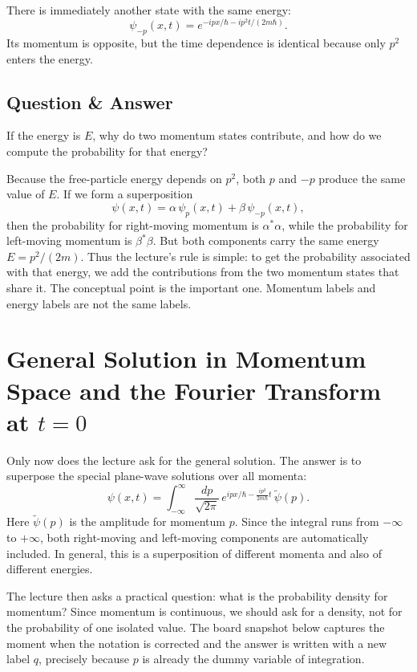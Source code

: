 There is immediately another state with the same energy:
\begin{equation}
\psi_{-p}(x,t)
=
e^{-ipx/\hbar - i p^2 t/(2m\hbar)}.
\end{equation}
Its momentum is opposite, but the time dependence is identical because only \(p^2\) enters the energy.

\subsection{Question \& Answer}

If the energy is \(E\), why do two momentum states contribute, and how do we compute the probability for that energy?

Because the free-particle energy depends on \(p^2\), both \(p\) and \(-p\) produce the same value of \(E\). If we form a superposition
\begin{equation}
\psi(x,t)=\alpha\,\psi_p(x,t)+\beta\,\psi_{-p}(x,t),
\end{equation}
then the probability for right-moving momentum is \(\alpha^*\alpha\), while the probability for left-moving momentum is \(\beta^*\beta\). But both components carry the same energy \(E=p^2/(2m)\). Thus the lecture's rule is simple: to get the probability associated with that energy, we add the contributions from the two momentum states that share it. The conceptual point is the important one. Momentum labels and energy labels are not the same labels.

\section{General Solution in Momentum Space and the Fourier Transform at \(t=0\)}

Only now does the lecture ask for the general solution. The answer is to superpose the special plane-wave solutions over all momenta:
\begin{equation}
\psi(x,t)
=
\int_{-\infty}^{\infty}
\frac{dp}{\sqrt{2\pi}}\,
e^{i p x/\hbar - \frac{i p^2}{2m\hbar}t}\,
\tilde\psi(p).
\end{equation}
Here \(\tilde\psi(p)\) is the amplitude for momentum \(p\). Since the integral runs from \(-\infty\) to \(+\infty\), both right-moving and left-moving components are automatically included. In general, this is a superposition of different momenta and also of different energies.

The lecture then asks a practical question: what is the probability density for momentum? Since momentum is continuous, we should ask for a density, not for the probability of one isolated value. The board snapshot below captures the moment when the notation is corrected and the answer is written with a new label \(q\), precisely because \(p\) is already the dummy variable of integration.


